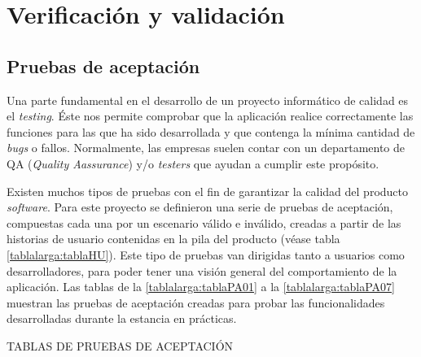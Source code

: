 \documentclass[pdftex,11pt,a4paper]{book}
\begin{document}

\chapter{Verificación y validación}

\section{Pruebas de aceptación}

Una parte fundamental en el desarrollo de un proyecto informático de calidad es el \textit{testing}.  Éste nos permite comprobar que la aplicación realice correctamente las funciones para las que ha sido desarrollada y que contenga la mínima cantidad de \textit{bugs} o fallos. Normalmente, las empresas suelen contar con un departamento de QA (\textit{Quality Aassurance}) y/o \textit{testers} que ayudan a cumplir este propósito. 

Existen muchos tipos de pruebas con el fin de garantizar la calidad del producto \textit{software}. Para este proyecto se definieron una serie de pruebas de aceptación, compuestas cada una por un escenario válido e inválido, creadas a partir de las historias de usuario contenidas en la pila del producto (véase tabla \ref{tablalarga:tablaHU}). Este tipo de pruebas van dirigidas tanto a usuarios como desarrolladores, para poder tener una visión general del comportamiento de la aplicación. Las tablas de la \ref{tablalarga:tablaPA01} a la \ref{tablalarga:tablaPA07} muestran las pruebas de aceptación creadas para probar las funcionalidades desarrolladas durante la estancia en prácticas. 

TABLAS DE PRUEBAS DE ACEPTACIÓN


\renewcommand{\tablename}{Tabla}
\renewcommand{\arraystretch}{1,7}
\end{document}
